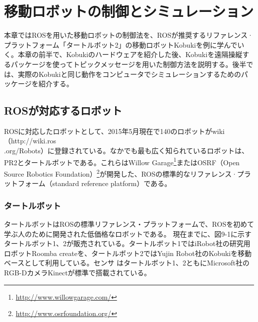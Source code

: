 
\chapter{移動ロボットの制御とシミュレーション}
\label{section:mobilerobot}

本章ではROSを用いた移動ロボットの制御法を、ROSが推奨するリファレンス·プラットフォーム「タートルボット2」の移動ロボットKobukiを例に学んでいく。本章の前半で、Kobukiのハードウェアを紹介した後、Kobukiを遠隔操縦するパッケージを使ってトピックメッセージを用いた制御方法を説明する。後半では、実際のKobukiと同じ動作をコンピュータでシミュレーションするためのパッケージを紹介する。

\section{ROSが対応するロボット}

ROSに対応したロボットとして、2015年5月現在で140のロボットがwiki（http://wiki.ros\\.org/Robots）に登録されている。なかでも最も広く知られているロボットは、PR2とタートルボットである。これらはWillow Garage\footnote{\url{http://www.willowgarage.com/}}またはOSRF（Open Source Robotics Foundation）\footnote{\url{http://www.osrfoundation.org/}}が開発した、ROSの標準的なリファレンス·プラットフォーム（standard reference platform）である。

\subsection{タートルボット}

タートルボットはROSの標準リファレンス・プラットフォームで、ROSを初めて学ぶ人のために開発された低価格なロボットである。
現在までに、図9-1に示すタートルボット1、2が販売されている。タートルボット1ではiRobot社の研究用ロボットRoomba createを、タートルボット2ではYujin Robot社のKobukiを移動ベースとして利用している。センサ    はタートルボット1、2ともにMicrosoft社のRGB-DカメラKinectが標準で搭載されている。

